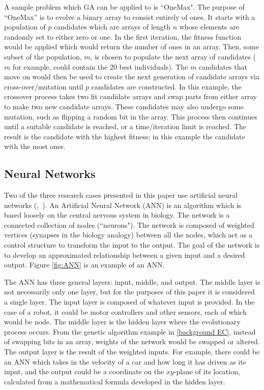 \documentclass{sig-alternate}
\begin{document}
  A sample problem which GA can be applied to is ``OneMax". The purpose of ``OneMax'' is to evolve a binary array to consist entirely of ones. It starts with a population of $p$ candidates which are arrays of length $n$ whose elements are randomly set to either zero or one. In the first iteration, the fitness function would be applied which would return the number of ones in an array. Then, some subset of the population, $m$, is chosen to populate the next array of candidates ($m$ for example, could contain the 20 best individuals). The $m$ candidates that move on would then be used to create the next generation of candidate arrays via cross-over/mutation until $p$ candidates are constructed. In this example, the crossover process takes two fit candidate arrays and swap parts from either array to make two new candidate arrays. These candidates may also undergo some mutation, such as flipping a random bit in the array. This process then continues until a suitable candidate is reached, or a time/iteration limit is reached. The result is the candidate with the highest fitness; in this example the candidate with the most ones.
  
\subsection{Neural Networks}
	Two of the three research cases presented in this paper use artificial neural networks (\cite{Moore:2013:ESK:2463372.2463402},~\cite{Pretorius:2009:TAN:1632149.1632171}). An Artificial Neural Network (ANN) \cite{wiki:robotics} is an algorithm which is based loosely on the central nervous system in biology. The network is a connected collection of nodes (``neurons"). The network is composed of weighted vertices (synapses in the biology analogy) between all the nodes, which act as a control structure to transform the input to the output. The goal of the network is to develop an approximated relationship between a given input and a desired output. Figure \ref{fig:ANN} is an example of an ANN.

	 The ANN has three general layers: input, middle, and output. The middle layer is not necessarily only one layer, but for the purposes of this paper it is considered a single layer. The input layer is composed of whatever input is provided. In the case of a robot, it could be motor controllers and other sensors, each of which would be node. The middle layer is the hidden layer where the evolutionary process occurs. From the genetic algorithm example in \ref{background EC}, instead of swapping bits in an array, weights of the network would be swapped or altered. The output layer is the result of the weighted inputs. For example, there could be an ANN which takes in the velocity of a car and how long it has driven as its input, and the output could be a coordinate on the $xy$-plane of its location, calculated from a mathematical formula developed in the hidden layer.  
\end{document}
